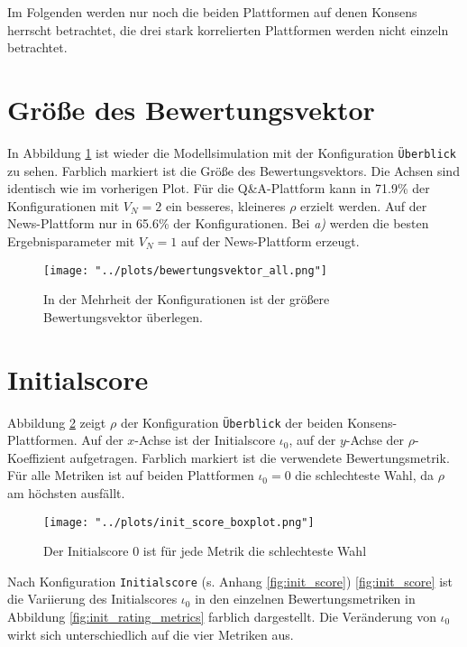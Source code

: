 Im Folgenden werden nur noch die beiden Plattformen auf denen Konsens herrscht betrachtet, die drei stark korrelierten Plattformen werden nicht einzeln betrachtet.


\section{Größe des Bewertungsvektor}

In Abbildung \ref{fig:bewertungsvektor} ist wieder die Modellsimulation mit der Konfiguration \texttt{Überblick}  zu sehen. Farblich markiert ist die Größe des Bewertungsvektors. Die Achsen sind identisch wie im vorherigen Plot. Für die Q\&A-Plattform kann in 71.9\% der Konfigurationen mit $V_N = 2$ ein besseres, kleineres $\rho$ erzielt werden. Auf der News-Plattform nur in 65.6\% der Konfigurationen. Bei \textit{a)} werden die besten Ergebnisparameter mit $V_N = 1$ auf der News-Plattform erzeugt.

\begin{figure}[!h]	
	\texttt{[image: "../plots/bewertungsvektor\_all.png"]}
	\caption{In der Mehrheit der Konfigurationen ist der größere Bewertungsvektor überlegen.}
	\label{fig:bewertungsvektor}
\end{figure}

\section{Initialscore}

Abbildung \ref{fig:initscore} zeigt $\rho$ der Konfiguration \texttt{Überblick} der beiden Konsens-Plattformen. Auf der $x$-Achse ist der Initialscore $\iota_0$, auf der $y$-Achse der $\rho$-Koeffizient aufgetragen. Farblich markiert ist die verwendete Bewertungsmetrik. Für alle Metriken ist auf beiden Plattformen $\iota_0 = 0$ die schlechteste Wahl, da $\rho$ am höchsten ausfällt.

\begin{figure}[!h]
	\texttt{[image: "../plots/init\_score\_boxplot.png"]}
	\caption{Der Initialscore $0$ ist für jede Metrik die schlechteste Wahl}
	\label{fig:initscore}
\end{figure}


Nach Konfiguration \texttt{Initialscore} (s. Anhang \ref{fig:init_score}) \ref{fig:init_score} ist die Variierung des Initialscores $\iota_0$ in den einzelnen Bewertungsmetriken in Abbildung \ref{fig:init_rating_metrics} farblich dargestellt. Die Veränderung von $\iota_0$ wirkt sich unterschiedlich auf die vier Metriken aus. 

